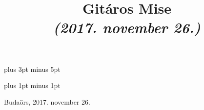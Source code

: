 \documentclass[a5paper,twoside]{article}
\title{Gitáros Mise\\\textit{(2017. november 26.)}}
\date{}
\renewcommand{\_}[1]{\underline{#1}} %
\begin{document}

  \begin{titlepage}
    \setlength{\oddsidemargin}{-1.625cm}

    \vspace*{4cm}
    {\let\newpage\relax\maketitle}
  \end{titlepage}

  \versesep=12pt plus 3pt minus 5pt

  \iflyric
    \baselineadj=2pt plus 1pt minus 1pt
  \fi


  \begin{songs}{}
    

    \renewcommand{\thesongnum}{T\arabic{songnum}}
    \setlength{\songnumwidth}{1.1cm}
    

    \renewcommand{\thesongnum}{K\arabic{songnum}}
    

    \renewcommand{\thesongnum}{M\arabic{songnum}}
    \setlength{\songnumwidth}{1.25cm}
    
  \end{songs}

  \newpage
  \thispagestyle{empty}

  \vspace*{\fill}
  Budaörs, 2017. november 26.
\end{document}
